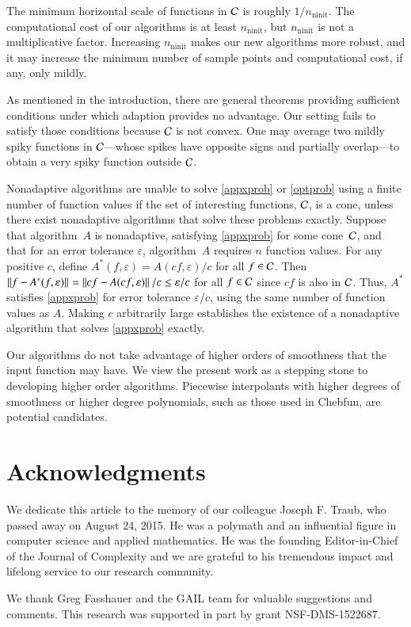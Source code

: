 \documentclass[review]{elsarticle}
\newcommand{\abstol}{\varepsilon}
\theoremstyle{definition}
\DeclareMathOperator{\ninit}{ninit}
\begin{document}
The minimum horizontal scale of functions in $\mathcal{C}$ is roughly $1/n_{\ninit}$. The
computational cost of our algorithms is at least $n_{\ninit}$, but $n_{\ninit}$ is not a
multiplicative factor. Increasing $n_{\ninit}$ makes our new algorithms more robust, and it may
increase the minimum number of sample points and %
computational cost, if any, only mildly.

As mentioned in the introduction, there are general theorems providing sufficient
conditions under which adaption provides
no advantage. Our setting fails to satisfy those conditions because $\mathcal{C}$ is not
convex. One may average two mildly spiky functions in $\mathcal{C}$---whose spikes have
opposite signs and partially overlap---to obtain a very spiky function outside
$\mathcal{C}$.

Nonadaptive algorithms are unable to solve \eqref{appxprob} or
\eqref{optprob} using a finite number of function values if the set of
interesting functions, $\mathcal{C}$, is a cone, unless there exist nonadaptive
algorithms that solve these problems exactly. Suppose that algorithm~$A$ is nonadaptive, satisfying \eqref{appxprob} for some cone~$\mathcal{C}$, and that for an error
tolerance $\abstol$, algorithm~$A$ requires $n$ function values. For any positive $c$,
define $A^*(f,\abstol) = A(cf,\abstol)/c$ for all $f \in \mathcal{C}$. Then $\norm{f -
A^*(f,\abstol)} = \norm{cf - A(cf,\abstol)}/c\le \abstol/c$ for all $f \in \mathcal{C}$
since $cf$ is also in $\mathcal{C}$. Thus, $A^*$ satisfies \eqref{appxprob} for error
tolerance $\abstol/c$, using the same number of function values as $A$.
Making $c$ arbitrarily large establishes the existence of a nonadaptive
algorithm that solves \eqref{appxprob} exactly.

Our algorithms do not take advantage of higher orders of
smoothness that the input function may have. We view the present work as a
stepping stone to developing higher order algorithms. Piecewise interpolants
with higher degrees of smoothness or higher degree polynomials, such as those used
in Chebfun, are potential candidates.


\section*{Acknowledgments}

We dedicate this article to the memory of our colleague Joseph F. Traub, who
passed away on August 24, 2015. He was a polymath and an influential figure in
computer science and applied mathematics. He was the founding Editor-in-Chief of
the Journal of Complexity and we are grateful to his tremendous impact and lifelong
service to our research community.

We thank Greg Fasshauer and the GAIL team for
valuable suggestions and comments. This research was supported in part by grant
NSF-DMS-1522687.





\end{document}
